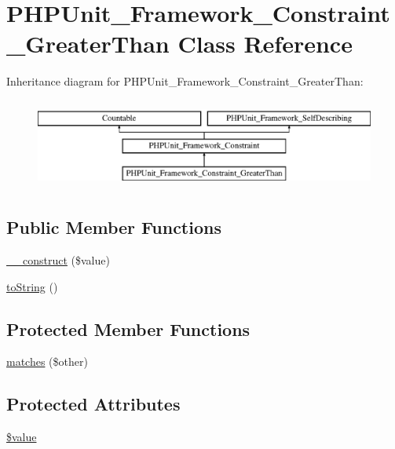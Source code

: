 \hypertarget{class_p_h_p_unit___framework___constraint___greater_than}{}\section{P\+H\+P\+Unit\+\_\+\+Framework\+\_\+\+Constraint\+\_\+\+Greater\+Than Class Reference}
\label{class_p_h_p_unit___framework___constraint___greater_than}
Inheritance diagram for P\+H\+P\+Unit\+\_\+\+Framework\+\_\+\+Constraint\+\_\+\+Greater\+Than\+:\begin{figure}[H]
\begin{center}
\leavevmode
\includegraphics[height=3.000000cm]{class_p_h_p_unit___framework___constraint___greater_than}
\end{center}
\end{figure}
\subsection*{Public Member Functions}
\begin{DoxyCompactItemize}
\item 
\mbox{\hyperlink{class_p_h_p_unit___framework___constraint___greater_than_a7e17a19b592345a03763f050fffe0ce7}{\+\_\+\+\_\+construct}} (\$value)
\item 
\mbox{\hyperlink{class_p_h_p_unit___framework___constraint___greater_than_a5558c5d549f41597377fa1ea8a1cefa3}{to\+String}} ()
\end{DoxyCompactItemize}
\subsection*{Protected Member Functions}
\begin{DoxyCompactItemize}
\item 
\mbox{\hyperlink{class_p_h_p_unit___framework___constraint___greater_than_a9c9c337de483bbdbb9fa249a6c7c9cc5}{matches}} (\$other)
\end{DoxyCompactItemize}
\subsection*{Protected Attributes}
\begin{DoxyCompactItemize}
\item 
\mbox{\hyperlink{class_p_h_p_unit___framework___constraint___greater_than_a0f298096f322952a72a50f98a74c7b60}{\$value}}
\end{DoxyCompactItemize}


